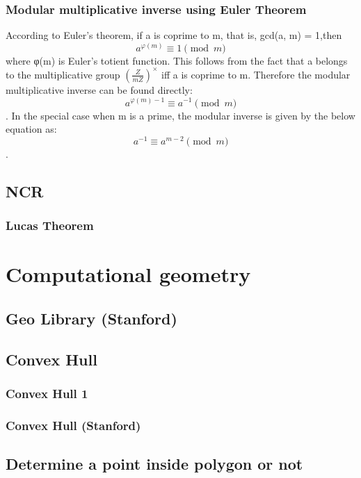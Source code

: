 \documentclass[11pt]{report}
\begin{document}
\subsection{Modular multiplicative inverse using Euler Theorem}
According to Euler's theorem, if a is coprime to m, that is, gcd(a, m) = 1,then
$$a^{\varphi(m)} \equiv 1 \pmod{m}$$
where φ(m) is Euler's totient function. This follows from the fact that a belongs to the multiplicative group $(\frac{Z}{mZ})^×$ iff a is coprime to m. Therefore the modular multiplicative inverse can be found directly:
$$a^{\varphi(m)-1} \equiv a^{-1} \pmod{m}$$.
In the special case when m is a prime, the modular inverse is given by the below equation as:
$$a^{-1} \equiv a^{m-2} \pmod{m}$$.
\section{NCR}
\subsection{Lucas Theorem}



\chapter{Computational geometry}
\section{Geo Library (Stanford)}

\section{Convex Hull}
\subsection{Convex Hull 1}

\subsection{Convex Hull (Stanford)}

\section{Determine a point inside polygon or not}

\end{document}
